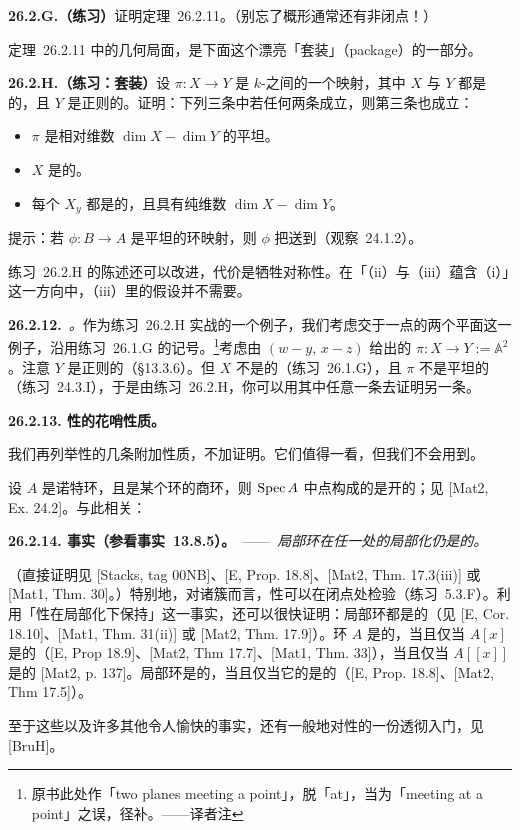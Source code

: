 \textbf{26.2.G.（练习）}\quad 证明\trMiracleFlat\mbox{定理~26.2.11}。（别忘了概形通常还有非闭点！）

\trMiracleFlat\mbox{定理~26.2.11} 中的几何局面，是下面这个漂亮「套装」（package）的一部分。

\textbf{26.2.H.（练习：\trMiracleFlat{}套装）}\quad 设 $\pi\colon X\to Y$ 是\trLocally\trFiniteType{} $k$-\trScheme{}之间的一个映射，其中 $X$ 与 $Y$ 都是\trPureDimensional{}的，且 $Y$ 是正则的。证明：下列三条中若任何两条成立，则第三条也成立：
\begin{itemize}
\item[（i）] $\pi$ 是相对维数 $\dim X-\dim Y$ 的平坦\trMorphism。
\item[（ii）] $X$ 是\trCM{}的。
\item[（iii）] 每个\trFiber{} $X_y$ 都是\trCM{}的，且具有纯维数 $\dim X-\dim Y$。
\end{itemize}
提示：若 $\phi\colon B\to A$ 是平坦的环映射，则 $\phi$ 把\trNonZerodivisor{}送到\trNonZerodivisor（\mbox{观察~24.1.2}）。

\mbox{练习~26.2.H} 的陈述还可以改进，代价是牺牲对称性。在「（ii）与（iii）蕴含（i）」这一方向中，（iii）里的\trCM{}假设并不需要。

\textbf{26.2.12.}\ \emph{\trhExample。}\quad 作为\mbox{练习~26.2.H} 实战的一个例子，我们考虑交于一点的两个平面这一例子，沿用\mbox{练习~26.1.G} 的记号。\footnote{原书此处作「two planes meeting a point」，脱「at」，当为「meeting at a point」之误，径补。——译者注}考虑由 $(w-y,\,x-z)$ 给出的\trMorphism{} $\pi\colon X\to Y:=\mathbb{A}^2$。注意 $Y$ 是正则的（\S13.3.6）。但 $X$ 不是\trCM{}的（\mbox{练习~26.1.G}），且 $\pi$ 不是平坦的（\mbox{练习~24.3.I}），于是由\mbox{练习~26.2.H}，你可以用其中任意一条去证明另一条。

\textbf{26.2.13. \trCM{}性的花哨性质。}

我们再列举\trCM{}性的几条附加性质，不加证明。它们值得一看，但我们不会用到。

设 $A$ 是诺特环，且是某个\trCM{}环的商环，则 $\operatorname{Spec} A$ 中\trCM{}点构成的\trLocus{}是开的；见 [Mat2, Ex. 24.2]。与此相关：

\textbf{26.2.14. 事实（参看\mbox{事实~13.8.5}）。}\ ——\ \emph{\trCM{}\trNoether{}局部环在任一\trPrimeIdeal{}处的局部化仍是\trCM{}的。}

（直接证明见 [Stacks, tag 00NB]、[E, Prop. 18.8]、[Mat2, Thm. 17.3(iii)] 或 [Mat1, Thm. 30]。）特别地，对诸簇而言，\trCM{}性可以在闭点处检验（\mbox{练习~5.3.F}）。利用「\trCM{}性在局部化下保持」这一事实，还可以很快证明：\trCM{}局部环都是\trCatenary{}的（见 [E, Cor. 18.10]、[Mat1, Thm. 31(ii)] 或 [Mat2, Thm. 17.9]）。环 $A$ 是\trCM{}的，当且仅当 $A[x]$ 是\trCM{}的（[E, Prop 18.9]、[Mat2, Thm 17.7]、[Mat1, Thm. 33]），当且仅当 $A[[x]]$ 是\trCM{}的 [Mat2, p. 137]。局部环是\trCM{}的，当且仅当它的\trCompletion{}是\trCM{}的（[E, Prop. 18.8]、[Mat2, Thm 17.5]）。

至于这些以及许多其他令人愉快的事实，还有一般地对\trCM{}性的一份透彻入门，见 [BruH]。
